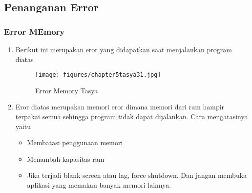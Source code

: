 \subsection{Penanganan Error}
\subsubsection{Error MEmory}
\begin{enumerate}
	\item
Berikut ini merupakan eror yang didapatkan saat menjalankan program diatas
\begin{figure}[ht]
\centering
\texttt{[image: figures/chapter5tasya31.jpg]}
\caption{Error Memory Tasya }
\label{Error}
\end{figure}
\item Eror diatas merupakan memori eror dimana memori dari ram hampir terpakai semua sehingga program tidak dapat dijalankan. Cara mengatasinya yaitu
\begin{itemize}
\item Membatasi penggunaan memori
\item Menambah kapasitas ram
\item Jika terjadi blank screen atau lag, force shutdown. Dan jangan membuka aplikasi yang memakan banyak memori lainnya.
\end{itemize}
\end{enumerate}

